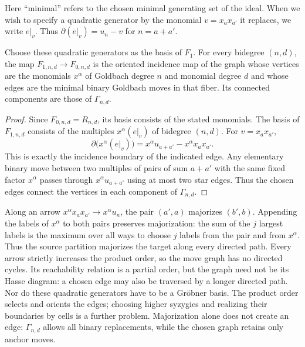 Here ``minimal'' refers to the chosen minimal generating set of the
ideal. When we wish to specify a quadratic generator by the monomial
$v=x_ax_{a'}$ it replaces, we write $\left.e\right|_v$. Thus
$\partial(\left.e\right|_v)=u_n-v$ for $n=a+a'$.

\begin{proposition}\label{moves:graph}
Choose these quadratic generators as the basis of $F_1$.
For every bidegree $(n,d)$,
the map $F_{1,n,d}\to F_{0,n,d}$ is the oriented incidence map
of the graph whose vertices are the monomials $x^\alpha$ of Goldbach degree
$n$ and monomial degree $d$
and whose edges are the minimal binary Goldbach moves in that fiber.
Its connected components are those of $\Gamma_{n,d}$.
\end{proposition}
\begin{proof}
Since $F_{0,n,d}=R_{n,d}$, its basis consists of the stated monomials.
The basis of $F_{1,n,d}$ consists of the multiples
$x^\alpha(\left.e\right|_v)$ of bidegree $(n,d)$. For $v=x_ax_{a'}$,
\[
 \partial\bigl(x^\alpha(\left.e\right|_v)\bigr)
     =x^\alpha u_{a+a'}-x^\alpha x_ax_{a'}.
\]
This is exactly the incidence boundary of the indicated edge.
Any elementary binary move between two multiples of pairs of sum
$a+a'$ with the same fixed factor $x^\alpha$ passes through $x^\alpha u_{a+a'}$
using at most two star edges. Thus the chosen edges connect the
vertices in each component of $\Gamma_{n,d}$.
\end{proof}

Along an arrow $x^\alpha x_ax_{a'}\to x^\alpha u_n$, the pair $(a',a)$ majorizes
$(b',b)$. Appending the labels of $x^\alpha$ to both pairs
preserves majorization: the sum of the $j$ largest labels is the
maximum over all ways to choose $j$ labels from the pair and from $x^\alpha$.
Thus the source partition majorizes the target along every directed path.
Every arrow strictly increases the product order, so the move graph
has no directed cycles. Its reachability relation is a partial order,
but the graph need not be its Hasse diagram: a chosen edge may also
be traversed by a longer directed path. Nor do these quadratic
generators have to be a Gr\"obner basis. The product order selects
and orients the edges; choosing higher syzygies and realizing their
boundaries by cells is a further problem.
Majorization alone does not create an edge: $\Gamma_{n,d}$ allows all
binary replacements, while the chosen graph retains only anchor moves.


